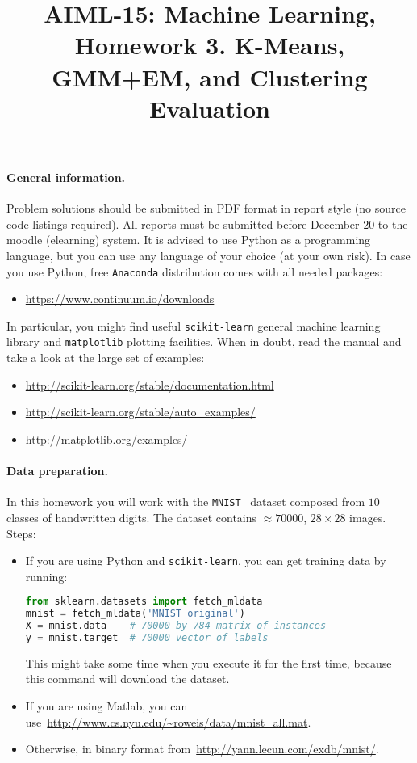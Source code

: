 \documentclass{article}
\title{AIML-15: Machine Learning, Homework 3. K-Means, GMM+EM, and Clustering Evaluation}
\begin{document}
\maketitle

\paragraph{General information.} Problem solutions should be submitted in PDF format in report style (no source code listings required).
All reports must be submitted before December $20$ to the moodle (elearning) system.
It is advised to use Python as a programming language, but you can use any language of your choice (at your own risk).
In case you use Python, free \verb!Anaconda! distribution comes with all needed packages:
\begin{itemize}
\item[] \url{https://www.continuum.io/downloads}
\end{itemize}
In particular, you might find useful \verb!scikit-learn! general machine learning library and \verb!matplotlib! plotting facilities. When in doubt, read the manual and take a look at the large set of examples:
\begin{itemize}
\item[] \url{http://scikit-learn.org/stable/documentation.html}
\item[] \url{http://scikit-learn.org/stable/auto_examples/}
\item[] \url{http://matplotlib.org/examples/}
\end{itemize}

\paragraph{Data preparation.} In this homework you will work with the \verb!MNIST!~\cite{lecun1998mnist} dataset composed from $10$ classes of handwritten digits.
The dataset contains $\approx 70000$, $28\times 28$ images. Steps:
\begin{itemize}
\item If you are using Python and \verb!scikit-learn!, you can get training data by running:
\begin{lstlisting}[language=Python]
from sklearn.datasets import fetch_mldata
mnist = fetch_mldata('MNIST original')
X = mnist.data    # 70000 by 784 matrix of instances
y = mnist.target  # 70000 vector of labels
\end{lstlisting}
This might take some time  when you execute it for the first time, because this command will download the dataset.
\item If you are using Matlab, you can use~\url{http://www.cs.nyu.edu/~roweis/data/mnist_all.mat}.
\item Otherwise, in binary format from~\url{http://yann.lecun.com/exdb/mnist/}.
\end{itemize}
\end{document}
